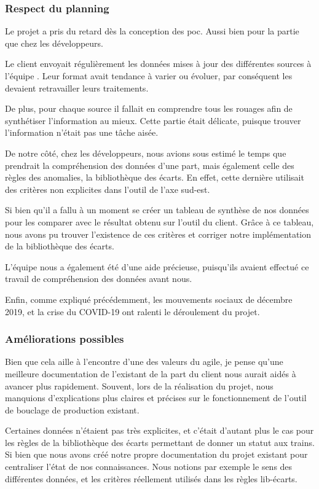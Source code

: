 \subsubsection{Respect du planning}

Le projet a pris du retard dès la conception des \gls{poc}. Aussi bien pour la partie \ds que chez les développeurs.

Le client envoyait régulièrement les données mises à jour des différentes sources \sncf à l'équipe \ds. Leur format avait tendance à varier ou évoluer, par conséquent les \ds devaient retravailler leurs traitements.

De plus, pour chaque source il fallait en comprendre tous les rouages afin de synthétiser l'information au mieux. Cette partie était délicate, puisque trouver l'information n'était pas une tâche aisée.

De notre côté, chez les développeurs, nous avions sous estimé le temps que prendrait la compréhension des données d'une part, mais également celle des règles des anomalies, la bibliothèque des écarts. En effet, cette dernière utilisait des critères non explicites dans l'outil de l'axe sud-est.

Si bien qu'il a fallu à un moment se créer un tableau de synthèse de nos données pour les comparer avec le résultat obtenu sur l'outil du client. Grâce à ce tableau, nous avons pu trouver l'existence de ces critères et corriger notre implémentation de la bibliothèque des écarts.

L'équipe \ds nous a également été d'une aide précieuse, puisqu'ils avaient effectué ce travail de compréhension des données avant nous.

Enfin, comme expliqué précédemment, les mouvements sociaux de décembre 2019, et la crise du \textsc{COVID-19} ont ralenti le déroulement du projet.

\newpage
\subsubsection{Améliorations possibles}

 Bien que cela aille à l'encontre d'une des valeurs du \gls{agile}, je pense qu'une meilleure documentation de l'existant de la part du client nous aurait aidés à avancer plus rapidement. Souvent, lors de la réalisation du projet, nous manquions d'explications plus claires et précises sur le fonctionnement de l'outil de bouclage de production existant.
 
 Certaines données n'étaient pas très explicites, et c'était d'autant plus le cas pour les règles de la bibliothèque des écarts permettant de donner un statut aux trains.
 Si bien que nous avons créé notre propre documentation du projet existant pour centraliser l'état de nos connaissances. Nous notions par exemple le sens des différentes données, et les critères réellement utilisés dans les règles lib-écarts.

